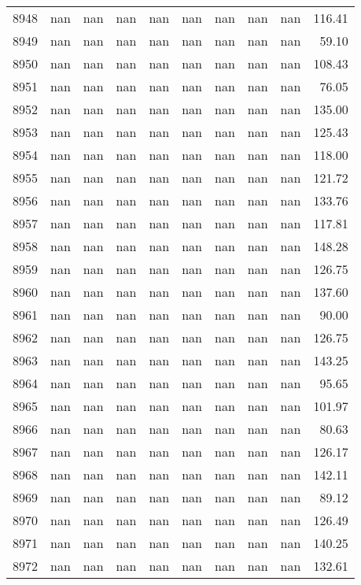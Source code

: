 \begin{tabular}{lrrrrrrrrr}
8948 & nan & nan & nan & nan & nan & nan & nan & nan & 116.41 \\
8949 & nan & nan & nan & nan & nan & nan & nan & nan & 59.10 \\
8950 & nan & nan & nan & nan & nan & nan & nan & nan & 108.43 \\
8951 & nan & nan & nan & nan & nan & nan & nan & nan & 76.05 \\
8952 & nan & nan & nan & nan & nan & nan & nan & nan & 135.00 \\
8953 & nan & nan & nan & nan & nan & nan & nan & nan & 125.43 \\
8954 & nan & nan & nan & nan & nan & nan & nan & nan & 118.00 \\
8955 & nan & nan & nan & nan & nan & nan & nan & nan & 121.72 \\
8956 & nan & nan & nan & nan & nan & nan & nan & nan & 133.76 \\
8957 & nan & nan & nan & nan & nan & nan & nan & nan & 117.81 \\
8958 & nan & nan & nan & nan & nan & nan & nan & nan & 148.28 \\
8959 & nan & nan & nan & nan & nan & nan & nan & nan & 126.75 \\
8960 & nan & nan & nan & nan & nan & nan & nan & nan & 137.60 \\
8961 & nan & nan & nan & nan & nan & nan & nan & nan & 90.00 \\
8962 & nan & nan & nan & nan & nan & nan & nan & nan & 126.75 \\
8963 & nan & nan & nan & nan & nan & nan & nan & nan & 143.25 \\
8964 & nan & nan & nan & nan & nan & nan & nan & nan & 95.65 \\
8965 & nan & nan & nan & nan & nan & nan & nan & nan & 101.97 \\
8966 & nan & nan & nan & nan & nan & nan & nan & nan & 80.63 \\
8967 & nan & nan & nan & nan & nan & nan & nan & nan & 126.17 \\
8968 & nan & nan & nan & nan & nan & nan & nan & nan & 142.11 \\
8969 & nan & nan & nan & nan & nan & nan & nan & nan & 89.12 \\
8970 & nan & nan & nan & nan & nan & nan & nan & nan & 126.49 \\
8971 & nan & nan & nan & nan & nan & nan & nan & nan & 140.25 \\
8972 & nan & nan & nan & nan & nan & nan & nan & nan & 132.61 \\

\end{tabular}
